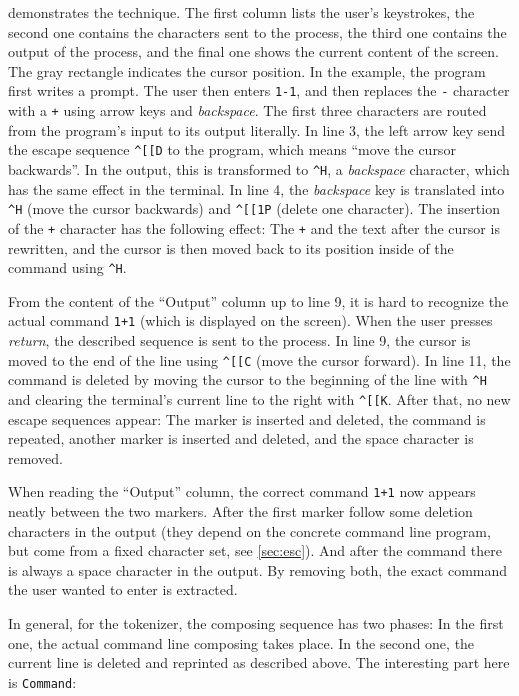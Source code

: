 \documentclass[paper=a4,twoside,abstract=on,cleardoublepage=empty,numbers=noenddot,toc=bib,toc=listof,12pt,appendixprefix=true]{scrreprt}
\newcommand{\escape}[1]{\textasciicircum #1}
\begin{document}
 demonstrates the technique. The first column lists the user's keystrokes, the second one contains the characters sent to the process, the third one contains the output of the process, and the final one shows the current content of the screen. The gray rectangle indicates the cursor position. In the example, the program first writes a prompt. The user then enters \texttt{1-1}, and then replaces the \texttt{-} character with a \texttt{+} using arrow keys and \emph{backspace}. The first three characters are routed from the program's input to its output literally. In line 3, the left arrow key send the escape sequence \texttt{\escape{[}[D} to the program, which means “move the cursor backwards”. In the output, this is transformed to \texttt{\escape{H}}, a \emph{backspace} character, which has the same effect in the terminal. In line 4, the \emph{backspace} key is translated into \texttt{\escape{H}} (move the cursor backwards) and \texttt{\escape{[}[1P} (delete one character). The insertion of the \texttt{+} character has the following effect: The \texttt{+} and the text after the cursor is rewritten, and the cursor is then moved back to its position inside of the command using \texttt{\escape{H}}.

From the content of the “Output” column up to line 9, it is hard to recognize the actual command \texttt{1+1} (which is displayed on the screen). When the user presses \emph{return}, the described sequence is sent to the process. In line 9, the cursor is moved to the end of the line using \texttt{\escape{[}[C} (move the cursor forward). In line 11, the command is deleted by moving the cursor to the beginning of the line with \texttt{\escape{H}} and clearing the terminal's current line to the right with \texttt{\escape{[}[K}. After that, no new escape sequences appear: The marker is inserted and deleted, the command is repeated, another marker is inserted and deleted, and the space character is removed.

When reading the “Output” column, the correct command \texttt{1+1} now appears neatly between the two markers. After the first marker follow some deletion characters in the output (they depend on the concrete command line program, but come from a fixed character set, see \cref{sec:esc}). And after the command there is always a space character in the output. By removing both, the exact command the user wanted to enter is extracted.

In general, for the tokenizer, the composing sequence has two phases: In the first one, the actual command line composing takes place. In the second one, the current line is deleted and reprinted as described above. The interesting part here is \texttt{Command}:
\end{document}
